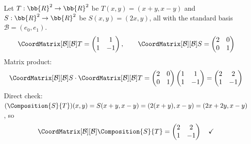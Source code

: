 \begin{example}[{$\CoordMatrix[\mathcal{B}_U][\mathcal{B}_W]{\Composition{S}{T}} = \CoordMatrix[\mathcal{B}_V][\mathcal{B}_W]{S} \cdot \CoordMatrix[\mathcal{B}_U][\mathcal{B}_V]{T}$} --- I]
    Let $T: \bb{R}^2 \to \bb{R}^2$ be $T(x,y) = (x + y, x - y)$ and
    $S: \bb{R}^2 \to \bb{R}^2$ be $S(x,y) = (2x, y)$, all with the standard basis
    $\mathcal{B} = (e_0, e_1)$.
    \[
        \CoordMatrix[\mathcal{B}][\mathcal{B}]{T}
        = \begin{pmatrix} 1 & 1 \\ 1 & -1 \end{pmatrix}, \qquad
        \CoordMatrix[\mathcal{B}][\mathcal{B}]{S}
        = \begin{pmatrix} 2 & 0 \\ 0 & 1 \end{pmatrix}
    \]
    Matrix product:
    \[
        \CoordMatrix[\mathcal{B}][\mathcal{B}]{S}
        \cdot \CoordMatrix[\mathcal{B}][\mathcal{B}]{T}
        = \begin{pmatrix} 2 & 0 \\ 0 & 1 \end{pmatrix}
          \begin{pmatrix} 1 & 1 \\ 1 & -1 \end{pmatrix}
        = \begin{pmatrix} 2 & 2 \\ 1 & -1 \end{pmatrix}
    \]
    Direct check: $(\Composition{S}{T})(x,y) = S(x+y, x-y) = (2(x+y), x-y)
    = (2x + 2y, x - y)$, so
    \[
        \CoordMatrix[\mathcal{B}][\mathcal{B}]{\Composition{S}{T}}
        = \begin{pmatrix} 2 & 2 \\ 1 & -1 \end{pmatrix} \quad \checkmark
    \]
\end{example}

